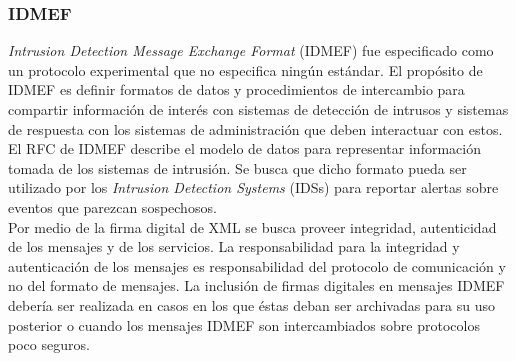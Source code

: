 \subsubsection{IDMEF}

\textit{Intrusion Detection Message Exchange Format} (IDMEF) fue especificado como un 
protocolo experimental que no especifica ningún estándar. El propósito de 
IDMEF es definir formatos de datos y procedimientos de intercambio para 
compartir información de interés con sistemas de detección de intrusos y 
sistemas de respuesta con los sistemas de administración que deben 
interactuar con estos. El RFC de IDMEF describe el modelo de datos para 
representar información tomada de los sistemas de intrusión. Se busca que dicho 
formato pueda ser utilizado por los \textit{Intrusion Detection Systems} (IDSs) para 
reportar alertas sobre eventos que parezcan sospechosos.\\

Por medio de la firma digital de XML se busca proveer integridad, autenticidad de 
los mensajes y de los servicios. La responsabilidad para la integridad y 
autenticación de los mensajes es responsabilidad del protocolo de comunicación y 
no del formato de mensajes. La inclusión de firmas digitales en mensajes IDMEF 
debería ser realizada en casos en los que éstas deban ser archivadas para su uso 
posterior o cuando los mensajes IDMEF son intercambiados sobre protocolos poco 
seguros.\\

